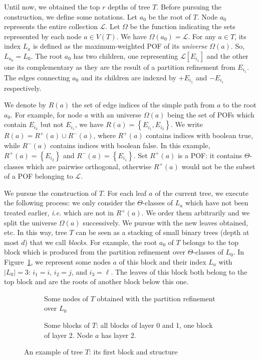 \documentclass{article}
\newcommand{\set}[1]{\left\{ #1 \right\}}
\newcommand{\card}[1]{\left| #1 \right|}
\begin{document}
Until now, we obtained the top $r$ depths of tree $T$. Before pursuing the construction, we define some notations. Let $a_0$ be the root of $T$. Node $a_0$ represents the entire collection $\mathcal{L}$. Let $\Omega$ be the function indicating the sets represented by each node $a \in V(T)$. We have $\Omega(a_0) = \mathcal{L}$. For any $a \in T$, its index $L_a$ is defined as the maximum-weighted POF of its \textit{universe} $\Omega(a)$. So, $L_{a_0} = L_0$. The root $a_0$ has two children, one representing $\mathcal{L}\left[E_{i_1}\right]$ and the other one its complementary as they are the result of a partition refinement from $E_{i_1}$. The edges connecting $a_0$ and its children are indexed by $+E_{i_1}$ and $-E_{i_1}$ respectively. 

We denote by $R(a)$ the set of edge indices of the simple path from $a$ to the root $a_0$. For example, for node $a$ with an universe $\Omega(a)$ being the set of POFs which contain  $E_{i_2}$ but not $E_{i_1}$, we have $R(a)=\set{E_{i_1},E_{i_2}}$. We write $R(a) = R^+(a) \cup R^-(a)$, where $R^+(a)$ contains indices with boolean true, while $R^-(a)$ contains indices with boolean false. In this example, $R^+(a) = \set{E_{i_2}}$ and $R^-(a) = \set{E_{i_1}}$. Set $R^+(a)$ is a POF: it contains $\Theta$-classes which are pairwise orthogonal, otherwise $R^+(a)$ would not be the subset of a POF belonging to $\mathcal{L}$.

We pursue the construction of $T$. For each leaf $a$ of the current tree, we execute the following process: we only consider the $\Theta$-classes of $L_a$ which have not been treated earlier, {\em i.e.} which are not in $R^+(a)$. We order them arbitrarily and we split the universe $\Omega(a)$ successively. We pursue with the new leaves obtained, etc. In this way, tree $T$ can be seen as a stacking of small binary trees (depth at most $d$) that we call \textit{blocks}. For example, the root $a_0$ of $T$ belongs to the top block which is produced from the partition refinement over $\Theta$-classes of $L_0$. In Figure~\ref{subfig:first_layer}, we represent some nodes $a$ of this block and their index $L_a$ with $\card{L_0} = 3$: $i_1 = i$, $i_2 = j$, and $i_3 = \ell$. The leaves of this block both belong to the top block and are the roots of another block below this one.

\begin{figure}[h]
\centering
\begin{subfigure}[b]{0.40\columnwidth}
\centering
\scalebox{0.7}{}
\caption{Some nodes of $T$ obtained with the partition refinement over $L_0$}
\label{subfig:first_layer}
\end{subfigure}
\begin{subfigure}[b]{0.59\columnwidth}
\centering
\scalebox{0.7}{}
\caption{Some blocks of $T$: all blocks of layer 0 and 1, one block of layer 2. Node $a$ has layer 2.}
\label{subfig:layers}
\end{subfigure}

\caption{An example of tree $T$: its first block and structure}
\label{fig:tree_2}
\end{figure}
\end{document}
